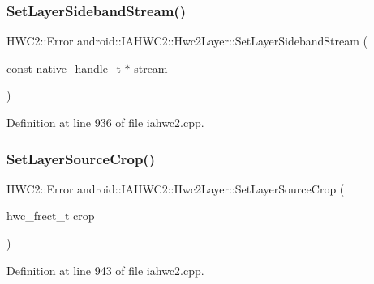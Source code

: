 \subsubsection{\texorpdfstring{Set\+Layer\+Sideband\+Stream()}{SetLayerSidebandStream()}}
{\footnotesize\ttfamily H\+W\+C2\+::\+Error android\+::\+I\+A\+H\+W\+C2\+::\+Hwc2\+Layer\+::\+Set\+Layer\+Sideband\+Stream (\begin{DoxyParamCaption}\item[{const native\+\_\+handle\+\_\+t $\ast$}]{stream }\end{DoxyParamCaption})}



Definition at line 936 of file iahwc2.\+cpp.


\begin{DoxyCode}{0}
\end{DoxyCode}
\mbox{\label{classandroid_1_1IAHWC2_1_1Hwc2Layer_ac093db321158cb01dfcdd646ddd037fe}} 
\subsubsection{\texorpdfstring{Set\+Layer\+Source\+Crop()}{SetLayerSourceCrop()}}
{\footnotesize\ttfamily H\+W\+C2\+::\+Error android\+::\+I\+A\+H\+W\+C2\+::\+Hwc2\+Layer\+::\+Set\+Layer\+Source\+Crop (\begin{DoxyParamCaption}\item[{hwc\+\_\+frect\+\_\+t}]{crop }\end{DoxyParamCaption})}



Definition at line 943 of file iahwc2.\+cpp.


